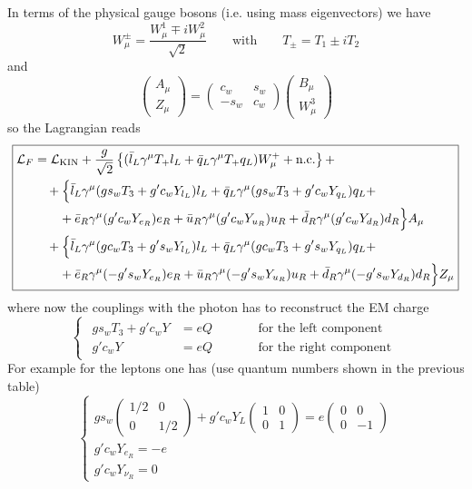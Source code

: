 \documentclass[TheoreticalPhy_ModB.tex]{subfiles}
\begin{document}
In terms of the physical gauge bosons (i.e. using mass eigenvectors) we have
\[W_\mu^\pm=\frac{W_\mu^1\mp iW_\mu^2}{\sqrt2}\qquad\text{with}\qquad T_\pm=T_1\pm iT_2\]
and
\[\begin{pmatrix}A_\mu\\ Z_\mu\end{pmatrix}=\begin{pmatrix}c_w&s_w\\-s_w&c_w\end{pmatrix}\begin{pmatrix}B_\mu\\W_\mu^3\end{pmatrix}\]
so the Lagrangian reads
\[\boxed{\begin{aligned}
\mathcal L_F
&=\mathcal L_{\text{KIN}}+\frac g{\sqrt2}\left\{(\bar l_L\gamma^\mu T_+l_L+\bar q_L\gamma^\mu T_+q_L)W_\mu^++\text{n.c.}\right\}+\\
&\quad+\Big\{\bar l_L\gamma^\mu(gs_wT_3+g'c_wY_{l_L})l_L+\bar q_L\gamma^\mu(gs_wT_3+g'c_wY_{q_L})q_L+\\
&\quad\quad+\bar e_R\gamma^\mu(g'c_wY_{e_R})e_R+\bar u_R\gamma^\mu(g'c_wY_{u_R})u_R+\bar d_R\gamma^\mu(g'c_wY_{d_R})d_R\Big\}A_\mu\\
&\quad+\Big\{\bar l_L\gamma^\mu(gc_wT_3+g's_wY_{l_L})l_L+\bar q_L\gamma^\mu(gc_wT_3+g's_wY_{q_L})q_L+\\
&\quad\quad+\bar e_R\gamma^\mu(-g's_wY_{e_R})e_R+\bar u_R\gamma^\mu(-g's_wY_{u_R})u_R+\bar d_R\gamma^\mu(-g's_wY_{d_R})d_R\Big\}Z_\mu
\end{aligned}}\]
where now the couplings with the photon has to reconstruct the EM charge
\[\begin{cases}\begin{aligned}
gs_wT_3+g'c_wY&=eQ&&\qquad\text{for the left component}\\
g'c_wY&=eQ&&\qquad\text{for the right component}
\end{aligned}\end{cases}\]
For example for the leptons one has (use quantum numbers shown in the previous table)
\[\begin{cases}
gs_w\begin{pmatrix}1/2&0\\0&1/2\end{pmatrix}+g'c_wY_L\begin{pmatrix}1&0\\0&1\end{pmatrix}=e\begin{pmatrix}0&0\\0&-1\end{pmatrix}\\
g'c_wY_{e_R}=-e\\
g'c_wY_{\nu_R}=0
\end{cases}\]
\end{document}
